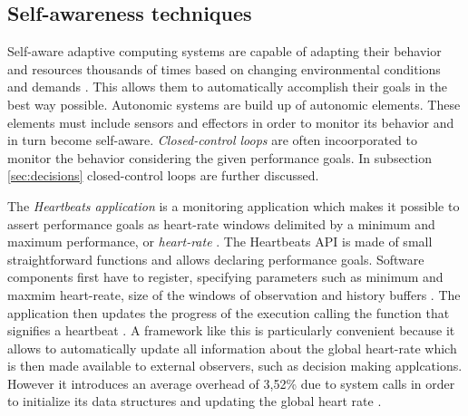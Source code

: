 \subsection{Self-awareness techniques}
\label{sec:selfawareness}
Self-aware adaptive computing systems are capable of adapting their behavior and resources thousands of times based on changing environmental conditions and demands \cite{selfaware}. 
This allows them to automatically accomplish their goals in the best way possible. Autonomic systems are build up of autonomic elements. These elements must include sensors and effectors \cite{autonomic} in order to monitor its behavior and in turn become self-aware. \emph{Closed-control loops} are often incoorporated to monitor the behavior considering the given performance goals. In subsection \ref{sec:decisions} closed-control loops are further discussed. 

The \emph{Heartbeats application} is a monitoring application which makes it possible to assert performance goals as heart-rate windows delimited by a minimum and maximum performance, or \emph{heart-rate} \cite{evolvable}. The Heartbeats API is made of small straightforward functions and allows declaring performance goals. Software components first have to register, specifying parameters such as minimum and maxmim heart-reate, size of the windows of observation and history buffers \cite{selfaware}. The application then updates the progress of the execution calling the function that signifies a heartbeat \cite{evolvable}. A framework like this is particularly convenient because it allows to automatically update all information about the global heart-rate which is then made available to external observers, such as decision making applcations. However it introduces an average overhead of 3,52\% due to system calls in order to initialize its data structures and updating the global heart rate \cite{selfaware}.
